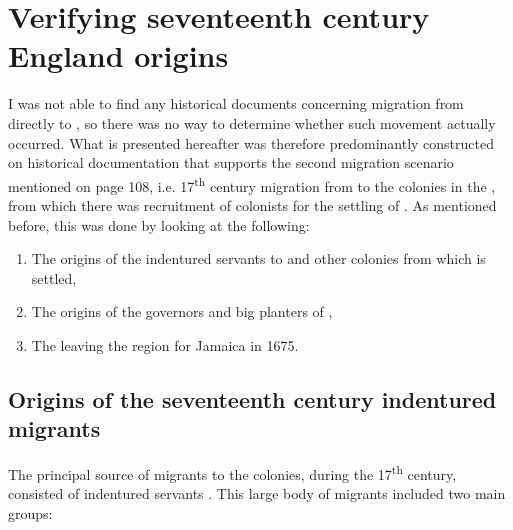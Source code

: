 \section{Verifying seventeenth century England origins}\label{6.2}
I was not able to find any historical documents concerning migration from  directly to , so there was no way to determine whether such movement actually occurred. What is presented hereafter was therefore predominantly constructed on historical documentation that supports the second migration scenario mentioned on page 108, i.e. 17\textsuperscript{th} century migration from  to the  colonies in the , from which there was recruitment of colonists for the settling of . As mentioned before, this was done by looking at the following:

\renewcommand{\labelenumii}{\theenumii}
\begin{enumerate}
\item {The origins of the  indentured servants to  and other  colonies from which  is settled,}
\item{The origins of the  governors and big planters of ,}
\item{The   leaving the  region for Jamaica in 1675.}
\end{enumerate}

\subsection{Origins of the seventeenth century indentured migrants}\label{6.2.1}
The principal source of  migrants to the  colonies, during the 17\textsuperscript{th} century, consisted of indentured servants \citep{Esposito82}. This large body of migrants included two main groups:

